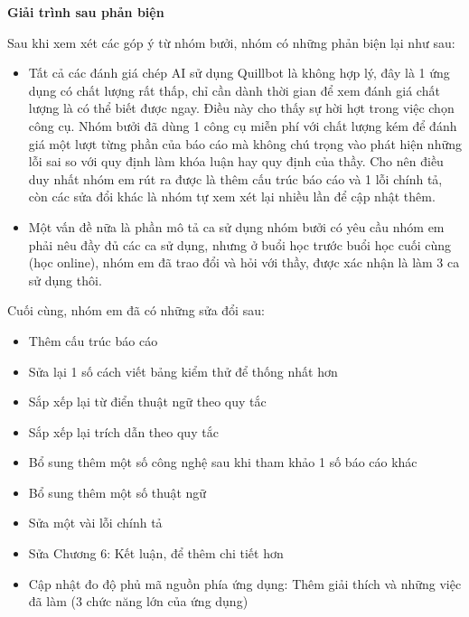 \documentclass{uetgraduation}
\begin{document}
\begin{contentlisting}
	\begin{center}
	    {\bfseries\fontsize{30}{36}\selectfont Giải trình sau phản biện}
	\end{center}
    \par
Sau khi xem xét các góp ý từ nhóm bưởi, nhóm có những phản biện lại như sau:
\begin{itemize}
    \item Tất cả các đánh giá chép AI sử dụng Quillbot là không hợp lý, đây là 1 ứng dụng có chất lượng rất thấp, chỉ cần dành thời gian để xem đánh giá chất lượng là có thể biết được ngay. Điều này cho thấy sự hời hợt trong việc chọn công cụ. Nhóm bưởi đã dùng 1 công cụ miễn phí với chất lượng kém để đánh giá một lượt từng phần của báo cáo mà không chú trọng vào phát hiện 
    những lỗi sai so với quy định làm khóa luận hay quy định của thầy. Cho nên điều duy nhất nhóm em rút ra được là thêm cấu trúc báo cáo và 1 lỗi chính tả, còn các sửa đổi khác là nhóm tự xem xét lại nhiều lần để cập nhật thêm.
    \item Một vấn đề nữa là phần mô tả ca sử dụng nhóm bưởi có yêu cầu nhóm em phải nêu đầy đủ các ca sử dụng, nhưng ở buổi học trước buổi học cuối cùng (học online), nhóm em đã trao đổi và hỏi với thầy, được xác nhận là làm 3 ca sử dụng thôi.
\end{itemize}
\par
Cuối cùng, nhóm em đã có những sửa đổi sau:
\begin{itemize}
    \item Thêm cấu trúc báo cáo
    \item Sửa lại 1 số cách viết bảng kiểm thử để thống nhất hơn
    \item Sắp xếp lại từ điển thuật ngữ theo quy tắc
    \item Sắp xếp lại trích dẫn theo quy tắc
    \item Bổ sung thêm một số công nghệ sau khi tham khảo 1 số báo cáo khác
    \item Bổ sung thêm một số thuật ngữ
    \item Sửa một vài lỗi chính tả
    \item Sửa Chương 6: Kết luận, để thêm chi tiết hơn
    \item Cập nhật đo độ phủ mã nguồn phía ứng dụng: Thêm giải thích và những việc đã làm (3 chức năng lớn của ứng dụng)
\end{itemize}


\end{contentlisting}


\end{document}
